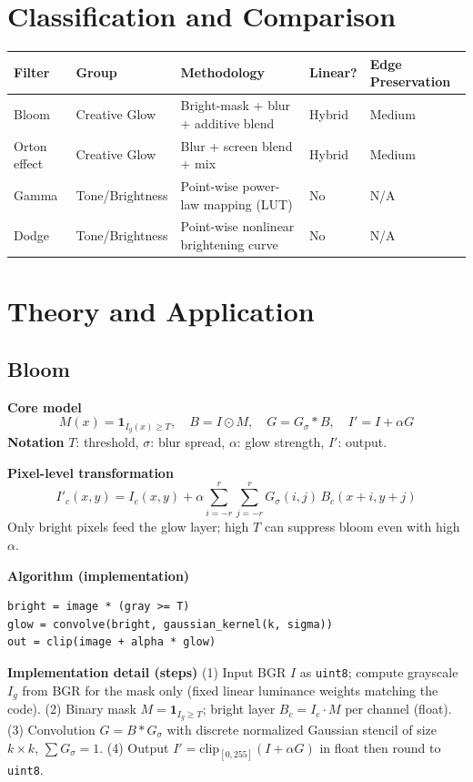 \documentclass[11pt,a4paper]{article}
\begin{document}
\section{Classification and Comparison}
\begin{center}
\begin{tabular}{@{}lllll@{}}
\toprule
\textbf{Filter} & \textbf{Group} & \textbf{Methodology} & \textbf{Linear?} & \textbf{Edge Preservation} \\
\midrule
Bloom & Creative Glow & Bright-mask + blur + additive blend & Hybrid & Medium \\
Orton effect & Creative Glow & Blur + screen blend + mix & Hybrid & Medium \\
Gamma & Tone/Brightness & Point-wise power-law mapping (LUT) & No & N/A \\
Dodge & Tone/Brightness & Point-wise nonlinear brightening curve & No & N/A \\
\bottomrule
\end{tabular}
\end{center}

\section{Theory and Application}

\subsection{Bloom}
\textbf{Core model}
\[
M(x)=\mathbf{1}_{I_g(x)\ge T},\quad B=I\odot M,\quad G=G_{\sigma}*B,\quad I'=I+\alpha G
\]
\textbf{Notation} \(T\): threshold, \(\sigma\): blur spread, \(\alpha\): glow strength, \(I'\): output.

\textbf{Pixel-level transformation}
\[
I'_c(x,y)=I_c(x,y)+\alpha\sum_{i=-r}^{r}\sum_{j=-r}^{r}G_{\sigma}(i,j)\,B_c(x+i,y+j)
\]
Only bright pixels feed the glow layer; high \(T\) can suppress bloom even with high \(\alpha\).

\textbf{Algorithm (implementation)}
\begin{lstlisting}[style=pycode]
bright = image * (gray >= T)
glow = convolve(bright, gaussian_kernel(k, sigma))
out = clip(image + alpha * glow)
\end{lstlisting}
\textbf{Implementation detail (steps)} 
(1) Input BGR \(I\) as \texttt{uint8}; compute grayscale \(I_g\) from BGR for the mask only (fixed linear luminance weights matching the code). 
(2) Binary mask \(M=\mathbf{1}_{I_g\ge T}\); bright layer \(B_c=I_c\cdot M\) per channel (float).
(3) Convolution \(G=B*G_\sigma\) with discrete normalized Gaussian stencil of size \(k\times k\), \(\sum G_\sigma=1\).
(4) Output \(I'=\mathrm{clip}_{[0,255]}(I+\alpha G)\) in float then round to \texttt{uint8}.
\end{document}
